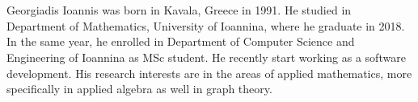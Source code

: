\chapter*{\cseviografiko}

Georgiadis Ioannis was born in Kavala, Greece in 1991. He studied in Department of Mathematics, University of Ioannina, where he graduate in 2018. In the same year, he enrolled in Department of Computer Science and Engineering of Ioannina as MSc student. He recently start working as a software development. His research interests are in the areas of applied mathematics, more specifically in applied algebra as well in graph theory.